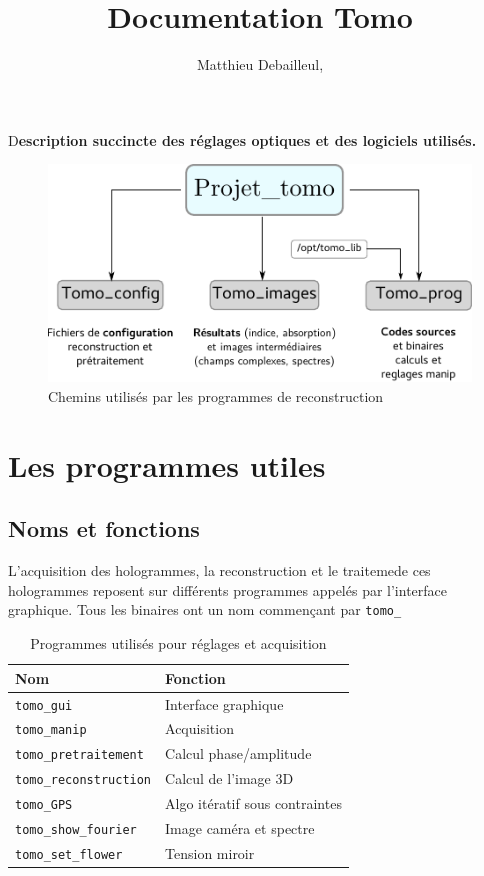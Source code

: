 \documentclass[	french,DIV=calc,%
							paper=a4,%
							fontsize=11pt,%
							twocolumn]{scrartcl}	 					%
\title{Documentation Tomo}					%
\author{Matthieu Debailleul, }											%
\date{}																				%
\newcommand{\code}[1]{\texttt{#1}}
\newcommand{\initial}[1]{%
     \lettrine[lines=3,lhang=0.3,nindent=0em]{
     				\color{DarkGoldenrod}
     				{\textsf{#1}}}{}}
\begin{document}
\maketitle
\thispagestyle{fancy} 			%
\initial{D}\textbf{escription succincte des réglages optiques et des logiciels utilisés.}

\begin{figure}
 \includegraphics[]{images/projet_tomo.pdf}
 \caption{Chemins utilisés par les programmes de reconstruction}\label{chemin_utile}
\end{figure}

\section{Les programmes utiles}
\subsection{Noms et fonctions}
L'acquisition des hologrammes, la reconstruction et le traitemede ces hologrammes reposent sur différents programmes appelés par l'interface graphique. Tous les binaires ont un nom commençant par \code{tomo\_}
\begin{table}
\begin{center}

{\small{
\begin{tabular}{|l|l|}	\hline
	Nom & Fonction \\\hline
\code{tomo\_gui}	& Interface graphique  \\\hline
\code{tomo\_manip}	& Acquisition \\\hline
\code{tomo\_pretraitement}	& Calcul phase/amplitude\\	\hline
\code{tomo\_reconstruction}	& Calcul de l'image 3D \\	\hline
\code{tomo\_GPS}	& Algo itératif sous contraintes \\ \hline
\code{tomo\_show\_fourier}	& Image caméra et spectre \\	\hline
\code{tomo\_set\_flower}	& Tension miroir \\	\hline
\end{tabular} 
}
}

\end{center}
\caption{Programmes utilisés pour réglages et acquisition}
\end{table}
	
\end{document}

